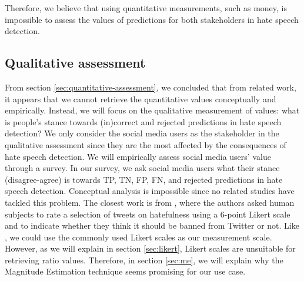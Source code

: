 %
Therefore, we believe that using quantitative measurements, such as money, is impossible to assess the values of predictions for both stakeholders in hate speech detection.
%

\subsection{Qualitative assessment}
From section \ref{sec:quantitative-assessment}, we concluded that from related work, it appears that we cannot retrieve the quantitative values conceptually and empirically.
%
Instead, we will focus on the qualitative measurement of values: what is people's stance towards (in)correct and rejected predictions in hate speech detection?
%
We only consider the social media users as the stakeholder in the qualitative assessment since they are the most affected by the consequences of hate speech detection.
%
We will empirically assess social media users' value through a survey.
%
In our survey, we ask social media users what their stance (disagree-agree) is towards TP, TN, FP, FN, and rejected predictions in hate speech detection.
%
Conceptual analysis is impossible since no related studies have tackled this problem.
%
The closest work is from \citet{ross2017measuring}, where the authors asked human subjects to rate a selection of tweets on hatefulness using a 6-point Likert scale and to indicate whether they think it should be banned from Twitter or not.
%
Like \citet{ross2017measuring}, we could use the commonly used Likert scales as our measurement scale.
%
However, as we will explain in section \ref{sec:likert}, Likert scales are unsuitable for retrieving ratio values.
%
Therefore, in section \ref{sec:me}, we will explain why the Magnitude Estimation technique seems promising for our use case.

